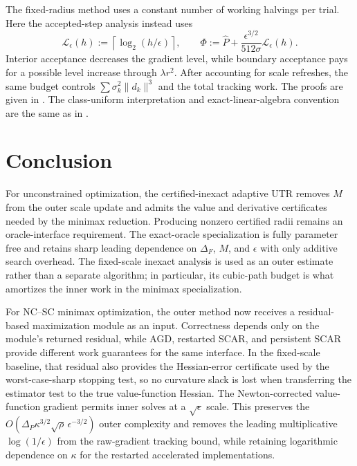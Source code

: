 \documentclass{article}
\begin{document}
The fixed-radius method uses a constant number of working halvings
per trial.  Here the accepted-step analysis instead uses
\begin{equation}\label{eq:gs-potential}
 \mathcal L_\epsilon(h):=\left\lceil\log_2(h/\epsilon)\right\rceil,
 \qquad
 \Phi:=\widehat P+\frac{\epsilon^{3/2}}{512\sigma}
                         \mathcal L_\epsilon(h).
\end{equation}
Interior acceptance decreases the gradient level, while boundary
acceptance pays for a possible level increase through $\lambda r^2$.
After accounting for scale refreshes, the same budget controls
$\sum \sigma_k^2\|d_k\|^3$ and the total tracking work.
The proofs are given in .
The class-uniform interpretation and exact-linear-algebra convention
are the same as in .

\section{Conclusion}

For unconstrained optimization, the certified-inexact adaptive UTR
removes $M$ from the outer scale update and admits the value and
derivative certificates needed by the minimax reduction.  Producing
nonzero certified radii remains an oracle-interface requirement.  The
exact-oracle specialization is fully parameter free and retains sharp
leading dependence on $\Delta_F$, $M$, and $\epsilon$ with only
additive search overhead.
The fixed-scale inexact analysis is used as an outer estimate rather
than a separate algorithm; in particular, its
cubic-path budget is what amortizes the inner work in the minimax
specialization.

For NC--SC minimax optimization, the outer method now receives a
residual-based maximization module as an input.  Correctness depends
only on the module's returned residual, while AGD, restarted SCAR, and
persistent SCAR provide different work guarantees for the same
interface.  In the fixed-scale baseline, that residual also provides
the Hessian-error certificate used by the worst-case-sharp stopping
test, so no curvature slack is lost when transferring the estimator
test to the true value-function Hessian.  The Newton-corrected
value-function gradient permits inner
solves at a $\sqrt\epsilon$ scale.  This preserves the
$O(\Delta_P\kappa^{3/2}\sqrt\rho\,\epsilon^{-3/2})$ outer complexity
and removes the leading multiplicative $\log(1/\epsilon)$ from the
raw-gradient tracking bound, while retaining logarithmic dependence on
$\kappa$ for the restarted accelerated implementations.
\end{document}
